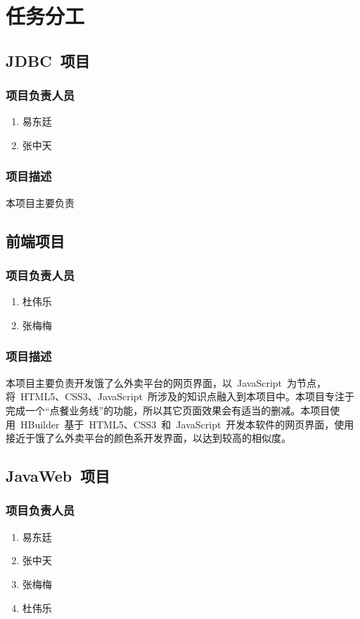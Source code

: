 \chapter{任务分工}
\section{JDBC~项目}
\subsection{项目负责人员}
\begin{enumerate}
    \item{易东廷}
    \item{张中天}
\end{enumerate}
\subsection{项目描述}
本项目主要负责

\section{前端项目}
\subsection{项目负责人员}
\begin{enumerate}
    \item{杜伟乐}
    \item{张梅梅}
\end{enumerate}
\subsection{项目描述}
本项目主要负责开发饿了么外卖平台的网页界面，以~JavaScript~为节点，将~HTML5、CSS3、JavaScript~所涉及的知识点融入到本项目中。本项目专注于完成一个“点餐业务线”的功能，所以其它页面效果会有适当的删减。本项目使用~HBuilder~基于~HTML5、CSS3~和~JavaScript~开发本软件的网页界面，使用接近于饿了么外卖平台的颜色系开发界面，以达到较高的相似度。

\section{JavaWeb~项目}
\subsection{项目负责人员}
\begin{enumerate}
    \item{易东廷}
    \item{张中天}
    \item{张梅梅}
    \item{杜伟乐}
\end{enumerate}
